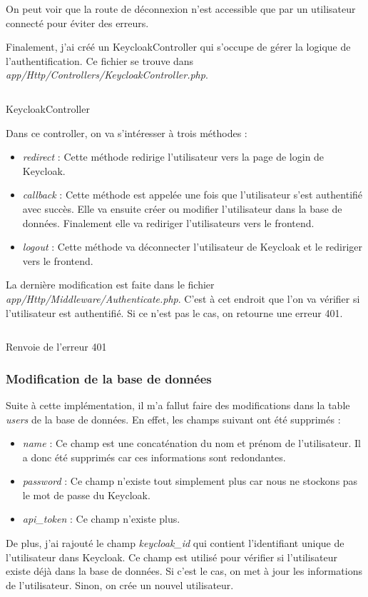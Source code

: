 On peut voir que la route de déconnexion n'est accessible que par un utilisateur connecté pour éviter des erreurs.

Finalement, j'ai créé un KeycloakController qui s'occupe de gérer la logique de l'authentification. Ce fichier se trouve dans \emph{app/Http/Controllers/KeycloakController.php}.

\begin{listing}[H]
    \inputminted{php}{assets/code/keycloakController.php}
    \caption{KeycloakController \label{keycloakController}}
\end{listing}

Dans ce controller, on va s'intéresser à trois méthodes :
\begin{itemize}
    \item \emph{redirect} : Cette méthode redirige l'utilisateur vers la page de login de Keycloak.
    \item \emph{callback} : Cette méthode est appelée une fois que l'utilisateur s'est authentifié avec succès. Elle va ensuite créer ou modifier l'utilisateur dans la base de données. Finalement elle va rediriger l'utilisateurs vers le frontend.
    \item \emph{logout} : Cette méthode va déconnecter l'utilisateur de Keycloak et le rediriger vers le frontend.
\end{itemize}

La dernière modification est faite dans le fichier \emph{app/Http/Middleware/Authenticate.php}. C'est à cet endroit que l'on va vérifier si l'utilisateur est authentifié. Si ce n'est pas le cas, on retourne une erreur 401.

\begin{listing}[H]
    \inputminted{php}{assets/code/authenticate.php}
    \caption{Renvoie de l'erreur 401 \label{authenticate}}
\end{listing}


\subsubsection{Modification de la base de données}
Suite à cette implémentation, il m'a fallut faire des modifications dans la table \emph{users} de la base de données. En effet, les champs suivant ont été supprimés :
\begin{itemize}
    \item \emph{name} : Ce champ est une concaténation du nom et prénom de l'utilisateur. Il a donc été supprimés car ces informations sont redondantes.
    \item \emph{password} : Ce champ n'existe tout simplement plus car nous ne stockons pas le mot de passe du Keycloak.
    \item \emph{api\_token} : Ce champ n'existe plus.
\end{itemize}

De plus, j'ai rajouté le champ \emph{keycloak\_id} qui contient l'identifiant unique de l'utilisateur dans Keycloak. Ce champ est utilisé pour vérifier si l'utilisateur existe déjà dans la base de données. Si c'est le cas, on met à jour les informations de l'utilisateur. Sinon, on crée un nouvel utilisateur.
